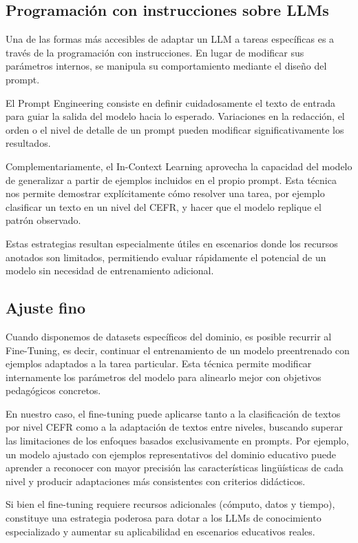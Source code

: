 \subsection{Programación con instrucciones sobre LLMs} \label{subsec:propmting}
Una de las formas más accesibles de adaptar un LLM a tareas específicas es a través de la programación con instrucciones. En lugar de modificar sus parámetros internos, se manipula su comportamiento mediante el diseño del prompt.

El Prompt Engineering consiste en definir cuidadosamente el texto de entrada para guiar la salida del modelo hacia lo esperado. Variaciones en la redacción, el orden o el nivel de detalle de un prompt pueden modificar significativamente los resultados.

Complementariamente, el In-Context Learning aprovecha la capacidad del modelo de generalizar a partir de ejemplos incluidos en el propio prompt. Esta técnica nos permite demostrar explícitamente cómo resolver una tarea, por ejemplo clasificar un texto en un nivel del CEFR,  y hacer que el modelo replique el patrón observado.

Estas estrategias resultan especialmente útiles en escenarios donde los recursos anotados son limitados, permitiendo evaluar rápidamente el potencial de un modelo sin necesidad de entrenamiento adicional.

\subsection{Ajuste fino} \label{subsec:finetuning}
Cuando disponemos de datasets específicos del dominio, es posible recurrir al Fine-Tuning, es decir, continuar el entrenamiento de un modelo preentrenado con ejemplos adaptados a la tarea particular. Esta técnica permite modificar internamente los parámetros del modelo para alinearlo mejor con objetivos pedagógicos concretos.

En nuestro caso, el fine-tuning puede aplicarse tanto a la clasificación de textos por nivel CEFR como a la adaptación de textos entre niveles, buscando superar las limitaciones de los enfoques basados exclusivamente en prompts. Por ejemplo, un modelo ajustado con ejemplos representativos del dominio educativo puede aprender a reconocer con mayor precisión las características lingüísticas de cada nivel y producir adaptaciones más consistentes con criterios didácticos.

Si bien el fine-tuning requiere recursos adicionales (cómputo, datos y tiempo), constituye una estrategia poderosa para dotar a los LLMs de conocimiento especializado y aumentar su aplicabilidad en escenarios educativos reales.
